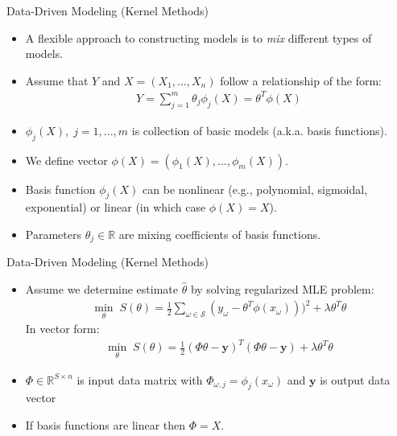 \documentclass[9pt]{beamer}
\begin{document}

\begin{frame}{Data-Driven Modeling (Kernel Methods)}
\begin{itemize}
  \setlength{\itemsep}{10pt}
\item A flexible approach to constructing models is to {\em mix} different types of models.  
\item Assume that $Y$ and $X=(X_1,...,X_n)$ follow a relationship of the form:
\begin{align*}
Y=\sum_{j=1}^m\theta_j \phi_j(X)=\theta^T\phi(X)
\end{align*}
\item $\phi_j(X),\; j=1,...,m$ is collection of basic models (a.k.a. basis functions). 

\item We define vector $\phi(X)=(\phi_1(X),...,\phi_m(X))$. 

\item Basis function $\phi_j(X)$ can be nonlinear (e.g., polynomial, sigmoidal, exponential) or linear (in which case $\phi(X)=X$). 

\item Parameters $\theta_j\in \mathbb{R}$ are mixing coefficients of basis functions.  

\end{itemize}

\end{frame}


\begin{frame}{Data-Driven Modeling (Kernel Methods)}
\begin{itemize}
  \setlength{\itemsep}{10pt}
\item Assume we determine estimate $\hat{\theta}$ by solving regularized MLE problem:
\begin{align*}
\min_{\theta}\; S(\theta)= \frac{1}{2}\sum_{\omega \in \mathcal{S}}(y_\omega-\theta^T\phi(x_\omega)))^2+\lambda \theta^T\theta
\end{align*}
In vector form:
\begin{align*}
\min_{\theta}\; S(\theta)= \frac{1}{2}(\Phi\theta -\mathbf{y})^T(\Phi\theta-\mathbf{y})+\lambda\theta^T\theta
\end{align*}
\item $\Phi\in \mathbb{R}^{S\times n}$ is input data matrix with $\Phi_{\omega,j}=\phi_{j}(x_\omega)$ and $\mathbf{y}$ is output data vector

\item If basis functions are linear then $\Phi=X$. 

\end{itemize}

\end{frame}
\end{document}

